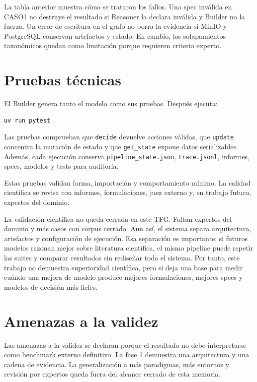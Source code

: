 La tabla anterior muestra cómo se trataron los fallos. Una spec inválida en
CASO1 no destruye el resultado si Reasoner la declara inválida y Builder no la
fuerza. Un error de escritura en el grafo no borra la evidencia si MinIO y
PostgreSQL conservan artefactos y estado. En cambio, los solapamientos
taxonómicos quedan como limitación porque requieren criterio experto.

\section{Pruebas técnicas}

El Builder genera tanto el modelo como sus pruebas. Después ejecuta:

\begin{verbatim}
uv run pytest
\end{verbatim}

Las pruebas comprueban que \texttt{decide} devuelve acciones válidas, que
\texttt{update} concentra la mutación de estado y que \texttt{get\_state}
expone datos serializables. Además, cada ejecución conserva
\texttt{pipeline\_state.json}, \texttt{trace.jsonl}, informes, specs, modelos y
tests para auditoría.

Estas pruebas validan forma, importación y comportamiento mínimo. La calidad
científica se revisa con informes, formulaciones, juez externo y, en trabajo
futuro, expertos del dominio.

La validación científica no queda cerrada en este TFG. Faltan expertos del
dominio y más casos con corpus cerrado. Aun así, el sistema separa arquitectura,
artefactos y configuración de ejecución. Esa separación es importante: si
futuros modelos razonan mejor sobre literatura científica, el mismo pipeline
puede repetir las suites y comparar resultados sin rediseñar todo el sistema.
Por tanto, este trabajo no demuestra superioridad científica, pero sí deja una
base para medir cuándo una mejora de modelo produce mejores formulaciones,
mejores specs y modelos de decisión más fieles.

\section{Amenazas a la validez}

Las amenazas a la validez se declaran porque el resultado no debe interpretarse
como benchmark externo definitivo. La fase 1 demuestra una arquitectura y una
cadena de evidencia. La generalización a más paradigmas, más entornos y revisión
por expertos queda fuera del alcance cerrado de esta memoria.


